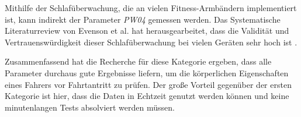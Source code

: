Mithilfe der Schlafüberwachung, die an vielen Fitness-Armbändern implementiert ist, kann indirekt der Parameter \textit{PW04} gemessen werden. Das Systematische Literaturreview von Evenson et al. hat herausgearbeitet, dass die Validität und Vertrauenswürdigkeit dieser Schlafüberwachung bei vielen Geräten sehr hoch ist \cite{reviewconsumerwearables}.

Zusammenfassend hat die Recherche für diese Kategorie ergeben, dass alle Parameter durchaus gute Ergebnisse liefern, um die körperlichen Eigenschaften eines Fahrers vor Fahrtantritt zu prüfen. Der große Vorteil gegenüber der ersten Kategorie ist hier, dass die Daten in Echtzeit genutzt werden können und keine minutenlangen Tests absolviert werden müssen.
